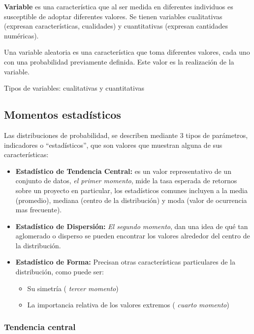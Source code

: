 \documentclass[
]{book}
\providecommand{\tightlist}{%
  \setlength{\itemsep}{0pt}\setlength{\parskip}{0pt}}
\begin{document}
\textbf{Variable} es una característica que al ser medida en diferentes individuos es susceptible de adoptar diferentes valores. Se tienen variables cualitativas (expresan características, cualidades) y cuantitativas (expresan cantidades numéricas).

Una variable aleatoria es una característica que toma diferentes valores, cada uno con una probabilidad previamente definida. Este valor es la realización de la variable.

Tipos de variables: cualitativas y cuantitativas

\hypertarget{momentos-estaduxedsticos}{%
\subsection{Momentos estadísticos}\label{momentos-estaduxedsticos}}

Las distribuciones de probabilidad, se describen mediante 3 tipos de parámetros, indicadores o ``estadísticos'', que son valores que muestran alguna de sus características:

\begin{itemize}
\tightlist
\item
  \textbf{Estadístico de Tendencia Central:} es un valor representativo de un conjunto de datos, \emph{el primer momento}, mide la tasa esperada de retornos sobre un proyecto en particular, los estadísticos comunes incluyen a la media (promedio), mediana (centro de la distribución) y moda (valor de ocurrencia mas frecuente).
\item
  \textbf{Estadístico de Dispersión:} \emph{El segundo momento}, dan una idea de qué tan aglomerado o disperso se pueden encontrar los valores alrededor del centro de la distribución.
\item
  \textbf{Estadístico de Forma:} Precisan otras características particulares de la distribución, como puede ser:

  \begin{itemize}
  \tightlist
  \item
    Su simetría ( \emph{tercer momento})
  \item
    La importancia relativa de los valores extremos ( \emph{cuarto momento})
  \end{itemize}
\end{itemize}

\hypertarget{tendencia-central}{%
\subsubsection{Tendencia central}\label{tendencia-central}}
\end{document}
